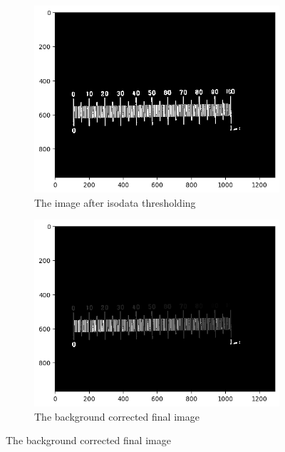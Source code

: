 \documentclass{article}
\begin{document}
\begin{figure}[h!]
  \begin{subfigure}{0.4\textwidth}
    \includegraphics[width=\linewidth]{Report/Appendix_Images/a4_thresholded.png}
    \caption{The image after isodata thresholding}
  \end{subfigure}
  \hfill
  \begin{subfigure}{0.4\textwidth}
    \includegraphics[width=\linewidth]{Report/Images/a4_background_correction.png}
    \caption{The background corrected final image}
  \end{subfigure}
\end{figure}
\end{document}
